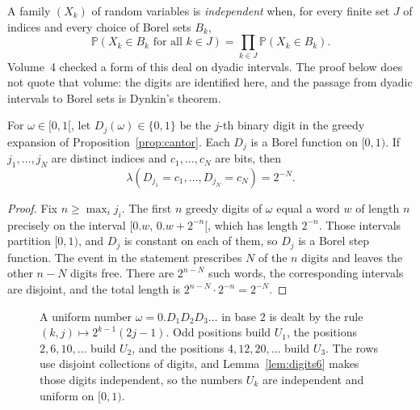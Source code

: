 A family $(X_k)$ of random variables is \emph{independent} when, for every finite set $J$ of indices and every choice of Borel sets $B_k$,
\[
\mathbb P(X_k\in B_k\text{ for all }k\in J)=\prod_{k\in J}\mathbb P(X_k\in B_k).
\]
Volume~4 checked a form of this deal on dyadic intervals.
The proof below does not quote that volume: the digits are identified here, and the passage from dyadic intervals to Borel sets is Dynkin's theorem.

\begin{lemma}\label{lem:digits6}
For $\omega\in[0,1[$, let $D_j(\omega)\in\{0,1\}$ be the $j$-th binary digit in the greedy expansion of Proposition~\ref{prop:cantor}.
Each $D_j$ is a Borel function on $[0,1)$.
If $j_1,\ldots,j_N$ are distinct indices and $c_1,\ldots,c_N$ are bits, then
\[
\lambda(D_{j_1}=c_1,\ldots,D_{j_N}=c_N)=2^{-N}.
\]
\end{lemma}
\begin{proof}
Fix $n\ge\max_i j_i$.
The first $n$ greedy digits of $\omega$ equal a word $w$ of length $n$ precisely on the interval $[0.w,\,0.w+2^{-n}[$, which has length $2^{-n}$.
Those intervals partition $[0,1)$, and $D_j$ is constant on each of them, so $D_j$ is a Borel step function.
The event in the statement prescribes $N$ of the $n$ digits and leaves the other $n-N$ digits free.
There are $2^{n-N}$ such words, the corresponding intervals are disjoint, and the total length is $2^{n-N}\cdot 2^{-n}=2^{-N}$.
\end{proof}

\begin{figure}[ht]
\centering
{}
\caption{A uniform number $\omega=0.D_1D_2D_3\ldots$ in base $2$ is dealt by the rule $(k,j)\mapsto 2^{k-1}(2j-1)$.
Odd positions build $U_1$, the positions $2,6,10,\ldots$ build $U_2$, and the positions $4,12,20,\ldots$ build $U_3$.
The rows use disjoint collections of digits, and Lemma~\ref{lem:digits6} makes those digits independent, so the numbers $U_k$ are independent and uniform on $[0,1)$.}
\label{fig:digits}
\end{figure}

